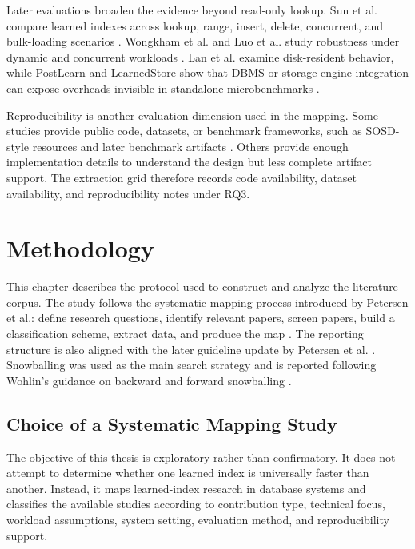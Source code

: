 \documentclass[a4paper, 12pt, twoside]{report}
\begin{document}
Later evaluations broaden the evidence beyond read-only lookup. Sun et al. compare learned indexes across lookup, range, insert, delete, concurrent, and bulk-loading scenarios \cite{sun2023learned}. Wongkham et al. and Luo et al. study robustness under dynamic and concurrent workloads \cite{wongkham2022ready,luo2025robustness}. Lan et al. examine disk-resident behavior, while PostLearn and LearnedStore show that DBMS or storage-engine integration can expose overheads invisible in standalone microbenchmarks \cite{lan2023disk,fuad2026postlearn,maharjan2023learnedstore}.

Reproducibility is another evaluation dimension used in the mapping. Some studies provide public code, datasets, or benchmark frameworks, such as SOSD-style resources and later benchmark artifacts \cite{marcus2020benchmarking,sun2023learned,wongkham2022ready}. Others provide enough implementation details to understand the design but less complete artifact support. The extraction grid therefore records code availability, dataset availability, and reproducibility notes under RQ3.

\chapter{Methodology}

This chapter describes the protocol used to construct and analyze the literature corpus. The study follows the systematic mapping process introduced by Petersen et al.: define research questions, identify relevant papers, screen papers, build a classification scheme, extract data, and produce the map \cite{petersen2008}. The reporting structure is also aligned with the later guideline update by Petersen et al. \cite{petersen2015}. Snowballing was used as the main search strategy and is reported following Wohlin's guidance on backward and forward snowballing \cite{wohlin2014}.

\section{Choice of a Systematic Mapping Study}

The objective of this thesis is exploratory rather than confirmatory. It does not attempt to determine whether one learned index is universally faster than another. Instead, it maps learned-index research in database systems and classifies the available studies according to contribution type, technical focus, workload assumptions, system setting, evaluation method, and reproducibility support.
\end{document}
